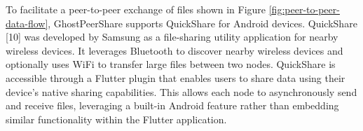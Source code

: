 To facilitate a peer-to-peer exchange of files shown in Figure \ref{fig:peer-to-peer-data-flow}, GhostPeerShare supports QuickShare \cite{samsung_quick_2020} for Android devices. QuickShare [10] was developed by Samsung as a file-sharing utility application for nearby wireless devices. It leverages Bluetooth to discover nearby wireless devices and optionally uses WiFi to transfer large files between two nodes. QuickShare is accessible through a Flutter plugin that enables users to share data using their device’s native sharing capabilities. This allows each node to asynchronously send and receive files, leveraging a built-in Android feature rather than embedding similar functionality within the Flutter application.
